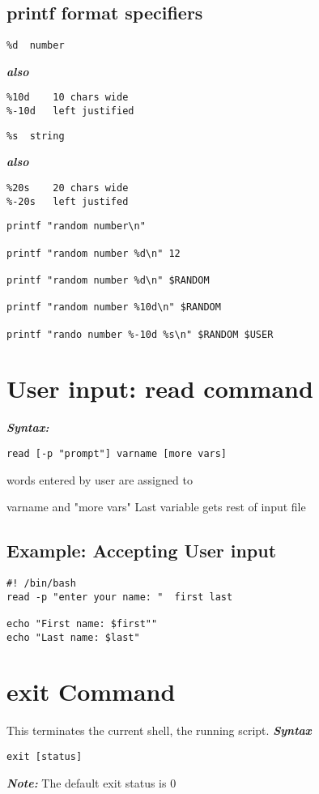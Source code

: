 \documentclass{report}
\begin{document}
\subsection{printf format specifiers}
\begin{verbatim}
%d  number
\end{verbatim}
\textit{\textbf{also}}
\begin{verbatim}
%10d    10 chars wide
%-10d   left justified
\end{verbatim}
\begin{verbatim}
%s  string
\end{verbatim}
\textit{\textbf{also}}
\begin{verbatim}
%20s    20 chars wide
%-20s   left justifed
\end{verbatim}
\newpage
\begin{mdframed}
\begin{verbatim}
printf "random number\n"

printf "random number %d\n" 12

printf "random number %d\n" $RANDOM

printf "random number %10d\n" $RANDOM

printf "rando number %-10d %s\n" $RANDOM $USER
\end{verbatim}
\end{mdframed}
\section{User input: read command}
\textit{\textbf{Syntax:}}
\begin{verbatim}
read [-p "prompt"] varname [more vars]
\end{verbatim}
words entered by user are assigned to \vspace{2mm}

\noindent varname and "more vars"
\bigbreak \noindent
Last variable gets rest of input file
\subsection{Example: Accepting User input}
\begin{verbatim}
#! /bin/bash
read -p "enter your name: "  first last

echo "First name: $first""
echo "Last name: $last"
\end{verbatim}
\section{exit Command}
This terminates the current shell, the running script.
\bigbreak \noindent
\textit{\textbf{Syntax}}
\begin{verbatim}
exit [status]
\end{verbatim}
\textit{\textbf{Note:}} The default exit status is 0
\end{document}
